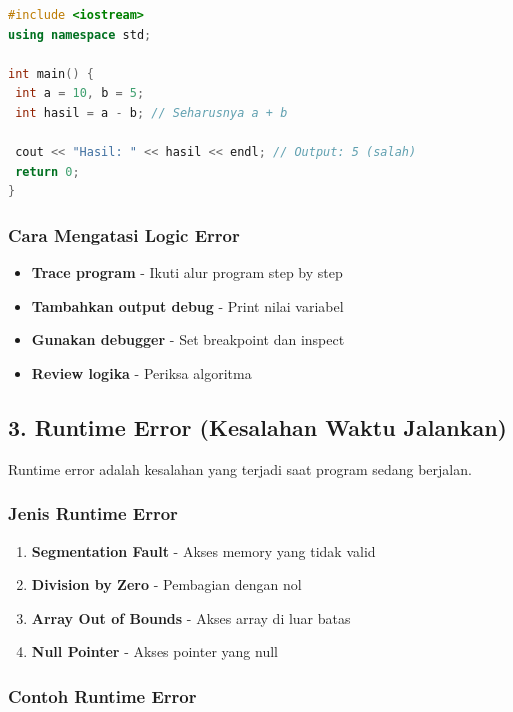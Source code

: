 \begin{lstlisting}[language=c++, caption=Contoh Logic Error]
#include <iostream>
using namespace std;

int main() {
 int a = 10, b = 5;
 int hasil = a - b; // Seharusnya a + b

 cout << "Hasil: " << hasil << endl; // Output: 5 (salah)
 return 0;
}
\end{lstlisting}

\subsubsection{Cara Mengatasi Logic Error}

\begin{itemize}
\item \textbf{Trace program} - Ikuti alur program step by step
\item \textbf{Tambahkan output debug} - Print nilai variabel
\item \textbf{Gunakan debugger} - Set breakpoint dan inspect
\item \textbf{Review logika} - Periksa algoritma
\end{itemize}

\subsection{3. Runtime Error (Kesalahan Waktu Jalankan)}

Runtime error adalah kesalahan yang terjadi saat program sedang berjalan.

\subsubsection{Jenis Runtime Error}

\begin{enumerate}
\item \textbf{Segmentation Fault} - Akses memory yang tidak valid
\item \textbf{Division by Zero} - Pembagian dengan nol
\item \textbf{Array Out of Bounds} - Akses array di luar batas
\item \textbf{Null Pointer} - Akses pointer yang null
\end{enumerate}

\subsubsection{Contoh Runtime Error}

